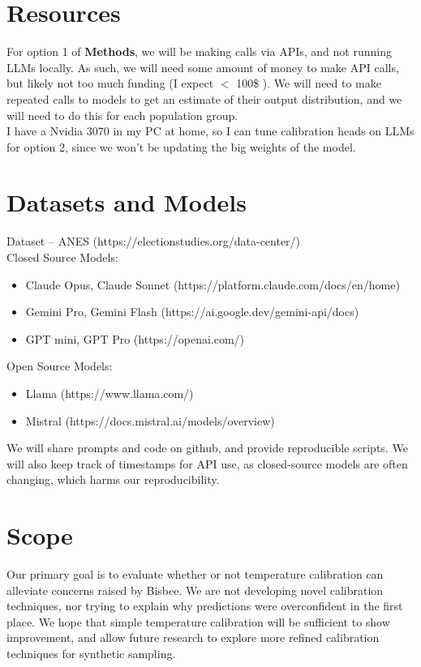 \documentclass{scrartcl}
\begin{document}
\section{Resources}
For option 1 of \textbf{Methods}, we will be making calls via APIs, and not running LLMs locally. As such, we will need some amount of money to make API calls, but likely not too much funding (I expect $<$ 100\$ ). We will need to make repeated calls to models to get an estimate of their output distribution, and we will need to do this for each population group.\\

I have a Nvidia 3070 in my PC at home, so I can tune calibration heads on LLMs for option 2, since we won't be updating the big weights of the model.

\section{Datasets and Models}
Dataset -- ANES (https://electionstudies.org/data-center/)\\
Closed Source Models: \begin{itemize}
    \item Claude Opus, Claude Sonnet (https://platform.claude.com/docs/en/home)
    \item Gemini Pro, Gemini Flash (https://ai.google.dev/gemini-api/docs)
    \item GPT mini, GPT Pro (https://openai.com/)
\end{itemize}
Open Source Models:\begin{itemize}
    \item Llama (https://www.llama.com/)
    \item Mistral (https://docs.mistral.ai/models/overview)
\end{itemize}

We will share prompts and code on github, and provide reproducible scripts. We will also keep track of timestamps for API use, as closed-source models are often changing, which harms our reproducibility.

\section{Scope}
Our primary goal is to evaluate whether or not temperature calibration can alleviate concerns raised by Bisbee. We are not developing novel calibration techniques, nor trying to explain why predictions were overconfident in the first place. We hope that simple temperature calibration will be sufficient to show improvement, and allow future research to explore more refined calibration techniques for synthetic sampling.

\newpage

\end{document}
